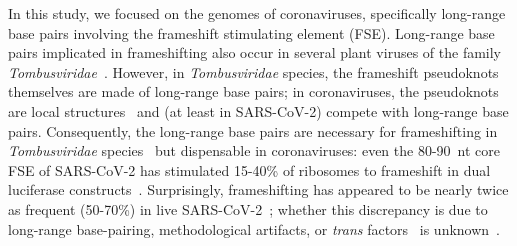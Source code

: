 \documentclass[main.tex]{subfiles}
\begin{document}
In this study, we focused on the genomes of coronaviruses, specifically long-range base pairs involving the frameshift stimulating element (FSE).
Long-range base pairs implicated in frameshifting also occur in several plant viruses of the family \textit{Tombusviridae}~\cite{Barry2002,Tajima2011,Mikkelsen2023}.
However, in \textit{Tombusviridae} species, the frameshift pseudoknots themselves are made of long-range base pairs; in coronaviruses, the pseudoknots are local structures~\cite{Brierley1989,Herald1993,Plant2005b,KZhang2021} and (at least in SARS-CoV-2) compete with long-range base pairs.
Consequently, the long-range base pairs are necessary for frameshifting in \textit{Tombusviridae} species~\cite{Barry2002,Tajima2011,Mikkelsen2023} but dispensable in coronaviruses: even the 80-90~nt core FSE of SARS-CoV-2 has stimulated 15-40\% of ribosomes to frameshift in dual luciferase constructs~\cite{Kelly2020,Haniff2020,KZhang2021,Bhatt2021,YSun2021,Lan2022}.
Surprisingly, frameshifting has appeared to be nearly twice as frequent (50-70\%) in live SARS-CoV-2~\cite{Finkel2021a,Kim2021,PurayChavez2022}; whether this discrepancy is due to long-range base-pairing, methodological artifacts, or \textit{trans} factors~\cite{Riegger2022} is unknown~\cite{Allan2023}.
\end{document}
